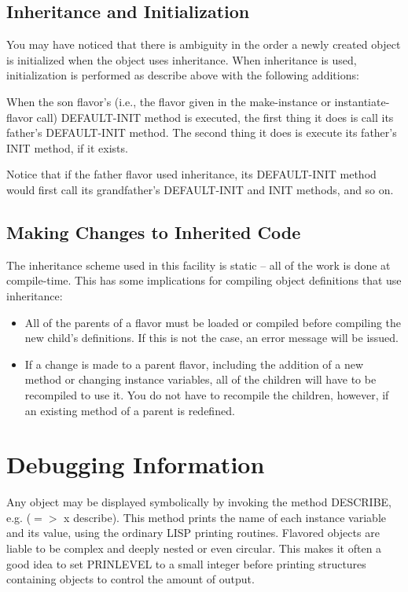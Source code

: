 \subsection{Inheritance and Initialization}

  You  may  have  noticed that there is ambiguity in the order a
newly  created  object  is  initialized  when  the  object  uses
inheritance.    When  inheritance  is  used,  initialization  is
performed as describe above with the following additions:

  When  the  son  flavor's  (i.e.,  the  flavor  given  in   the
make-instance or instantiate-flavor call) DEFAULT-INIT method is
executed,   the  first  thing  it  does  is  call  its  father's
DEFAULT-INIT method.  The second thing it does  is  execute  its
father's INIT method, if it exists.

  Notice  that  if  the  father  flavor  used  inheritance,  its
DEFAULT-INIT  method  would   first   call   its   grandfather's
DEFAULT-INIT  and INIT methods, and so on.

\subsection{Making Changes to Inherited Code}

  The  inheritance scheme used in this facility is static -- all
of the work is done at compile-time.  This has some implications
for compiling object definitions that use inheritance:

\begin{itemize}
\item All of the parents of a flavor must be loaded  or  compiled
     before  compiling  the new child's definitions.  If this is
     not the case, an error message will be issued.
\item If a change is made  to  a  parent  flavor,  including  the
     addition  of  a  new method or changing instance variables,
     all of the children will have to be recompiled to  use  it.
     You  do  not have to recompile the children, however, if an
     existing method of a parent is redefined.
\end{itemize}

\section{Debugging Information}

  Any object may  be  displayed  symbolically  by  invoking  the
method  DESCRIBE,  e.g. ($=>$ x describe). This method prints the
name of each instance variable and its value, using the ordinary
LISP printing routines.   Flavored  objects  are  liable  to  be
complex and deeply nested or even circular.  This makes it often
a  good idea to set PRINLEVEL to a small integer before printing
structures containing objects to control the amount of output.

